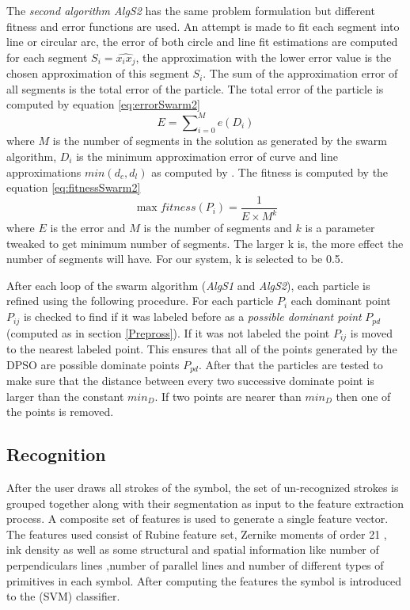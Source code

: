 \documentclass{article}
\begin{document}
The \textit{second algorithm \textsl{AlgS2}} has the same problem formulation but different fitness and error functions are used. An attempt is made to fit each segment into line or circular arc, the error of both circle and line fit estimations are computed for each segment $S_i=\widehat{x_ix_j}$, the approximation with the lower error value is the chosen approximation of this segment $S_i$\cite{CruveDivisionSwarm}. The sum of the approximation error of all segments is the total error of the particle.  The total error of the particle is computed by equation \ref{eq:errorSwarm2}
 \begin{equation}
E=\sum\nolimits_{i = 0}^M e(D_i) 
\label{eq:errorSwarm2}
\end{equation}where $M$ is the number of segments in the solution as generated by the swarm algorithm, $D_i$ is the minimum approximation error of curve and line approximations $min(d_c,d_l)$ as computed by \cite{CruveDivisionSwarm}.  The fitness is computed by the equation \ref{eq:fitnessSwarm2} \begin{equation}
\max fitness(P_i ) = \frac{1}{{E \times M^k }}
\label{eq:fitnessSwarm2}
\end{equation} where $E$ is the error and $M$ is the number of segments and $k$ is a parameter tweaked to get minimum number of segments. The larger k is, the more effect the number of segments will have. For our system, k is selected to be 0.5\cite{CruveDivisionSwarm}.

After each loop of the swarm algorithm (\textsl{AlgS1} and \textsl{AlgS2}), each particle is refined using the following procedure. For each particle $P_i$ each dominant point $P_{ij}$ is checked to find if it was labeled before as a \textit{possible dominant point} $P_{pd}$ (computed as in section \ref{Prepross}). If it was not labeled the point $P_{ij}$ is moved to the nearest labeled point. This ensures that all of the points generated by the DPSO are possible dominate points $P_{pd}$. After that the particles are tested to make sure that the distance between every two successive dominate point is larger than the constant $min_D$. If two points are nearer than $min_D$ then one of the points is removed. 
\subsection{Recognition}
\label{sec:Recognition}
After the user draws all strokes of the symbol, the set of un-recognized strokes is grouped together along with their segmentation as input to the feature extraction process. A composite set of features is used to generate a single feature vector. The features used consist of Rubine feature set,  Zernike moments of order 21 \cite{HeloiseBeautification}, ink density as well as some structural and spatial information like number of perpendiculars lines ,number of parallel lines and number of different types of primitives in each symbol. After computing the features the symbol is introduced to the (SVM) classifier. 
\end{document}

